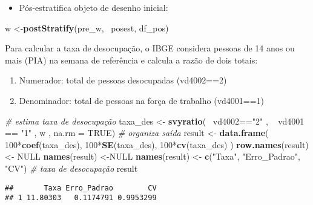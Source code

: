 \documentclass[]{book}
\newenvironment{Shaded}{\begin{snugshade}}{\end{snugshade}}
\newcommand{\KeywordTok}[1]{\textcolor[rgb]{0.13,0.29,0.53}{\textbf{{#1}}}}
\newcommand{\DataTypeTok}[1]{\textcolor[rgb]{0.13,0.29,0.53}{{#1}}}
\newcommand{\DecValTok}[1]{\textcolor[rgb]{0.00,0.00,0.81}{{#1}}}
\newcommand{\StringTok}[1]{\textcolor[rgb]{0.31,0.60,0.02}{{#1}}}
\newcommand{\CommentTok}[1]{\textcolor[rgb]{0.56,0.35,0.01}{\textit{{#1}}}}
\newcommand{\OtherTok}[1]{\textcolor[rgb]{0.56,0.35,0.01}{{#1}}}
\newcommand{\NormalTok}[1]{{#1}}
\providecommand{\tightlist}{%
  \setlength{\itemsep}{0pt}\setlength{\parskip}{0pt}}
\numberwithin{example}{chapter}
\numberwithin{remark}{chapter}
\numberwithin{definition}{chapter}
\begin{document}
\begin{itemize}
\tightlist
\item
  Pós-estratifica objeto de desenho inicial:
\end{itemize}

\begin{Shaded}
\begin{Highlighting}[]
\NormalTok{w <-}\KeywordTok{postStratify}\NormalTok{(pre_w, ~posest, df_pos)}
\end{Highlighting}
\end{Shaded}

Para calcular a taxa de desocupação, o IBGE considera pessoas de 14 anos
ou mais (PIA) na semana de referência e calcula a razão de dois totais:

\begin{enumerate}
\def\labelenumi{\arabic{enumi}.}
\item
  Numerador: total de pessoas desocupadas (vd4002==2)
\item
  Denominador: total de pessoas na força de trabalho (vd4001==1)
\end{enumerate}

\begin{Shaded}
\begin{Highlighting}[]
\CommentTok{# estima taxa de desocupação}
\NormalTok{taxa_des <-}\StringTok{ }\KeywordTok{svyratio}\NormalTok{(~}\StringTok{ }\NormalTok{vd4002==}\StringTok{"2"} \NormalTok{,}
  \NormalTok{~}\StringTok{ }\NormalTok{vd4001 ==}\StringTok{ "1"} \NormalTok{, w , }\DataTypeTok{na.rm =} \OtherTok{TRUE}\NormalTok{)}
\CommentTok{# organiza saída}
\NormalTok{result <-}\StringTok{ }\KeywordTok{data.frame}\NormalTok{(}
  \DecValTok{100}\NormalTok{*}\KeywordTok{coef}\NormalTok{(taxa_des),}
  \DecValTok{100}\NormalTok{*}\KeywordTok{SE}\NormalTok{(taxa_des), }
  \DecValTok{100}\NormalTok{*}\KeywordTok{cv}\NormalTok{(taxa_des)}
\NormalTok{)}
\KeywordTok{row.names}\NormalTok{(result)<-}\StringTok{ }\OtherTok{NULL}
\KeywordTok{names}\NormalTok{(result) <-}\OtherTok{NULL}
\KeywordTok{names}\NormalTok{(result) <-}\StringTok{ }\KeywordTok{c}\NormalTok{(}\StringTok{"Taxa"}\NormalTok{, }\StringTok{"Erro_Padrao"}\NormalTok{, }\StringTok{"CV"}\NormalTok{)}
\CommentTok{# taxa de desocupação}
\NormalTok{result}
\end{Highlighting}
\end{Shaded}

\begin{verbatim}
##       Taxa Erro_Padrao        CV
## 1 11.80303   0.1174791 0.9953299
\end{verbatim}
\end{document}
